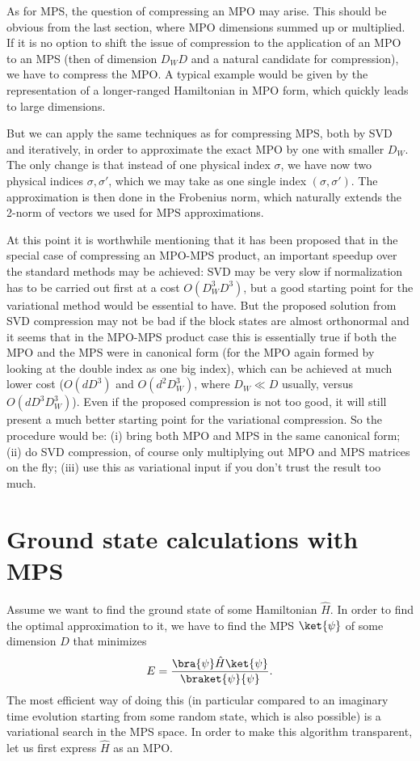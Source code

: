 As for MPS, the question of compressing an MPO may arise. This should be obvious from the last section, where MPO dimensions summed up or multiplied. If it is no option to shift the issue of compression to the application of an MPO to an MPS (then of dimension $D_W D$ and a natural candidate for compression), we have to compress the MPO. A typical example would be given by the representation of a longer-ranged Hamiltonian in MPO form, which quickly leads to large dimensions.

But we can apply the same techniques as for compressing MPS, both by SVD and iteratively, in order to approximate the exact MPO by one with smaller $D_W$. The only change is that instead of one physical index $\sigma$, we have now two physical indices $\sigma,\sigma'$, which we may take as one single index $(\sigma,\sigma')$. The approximation is then done in the Frobenius norm, which naturally extends the 2-norm of vectors we used for MPS approximations.

At this point it is worthwhile mentioning that it has been proposed \cite{Stoudenmire10} that in the special case of compressing an MPO-MPS product, an important speedup over the standard methods may be achieved: SVD may be very slow if normalization has to be carried out first at a cost $O(D_W^3 D^3)$, but a good starting point for the variational method would be essential to have. But the proposed solution from SVD compression may not be bad if the block states are almost orthonormal and it seems that in the MPO-MPS product case this is essentially true if both the MPO and the MPS were in canonical form (for the MPO again formed by looking at the double index as one big index), which can be achieved at much lower cost ($O(d D^3)$ and $O(d^2 D_W^3)$, where $D_W \ll D$ usually, versus $O(d D^3 D_W^3)$). Even if the proposed compression is not too good, it will still present a much better starting point for the variational compression. So the procedure would be: (i) bring both MPO and MPS in the same canonical form; (ii) do SVD compression, of course only multiplying out MPO and MPS matrices on the fly; (iii) use this as variational input if you don't trust the result too much. 


 
\section{Ground state calculations with MPS}
\label{sec:groundstates}
Assume we want to find the ground state of some Hamiltonian $\hat{H}$.  In order to find the optimal approximation to it, we have to find the MPS $\ket{\psi}$ of some dimension $D$ that minimizes
\begin{equation}
E = \frac{\bra{\psi} \hat{H} \ket{\psi}}{\braket{\psi}{\psi}} .
\end{equation} 
The most efficient way of doing this (in particular compared to an imaginary time evolution starting from some random state, which is also possible) is a variational search in the MPS space. In order to make this algorithm transparent, let us first express $\hat{H}$ as an MPO.


